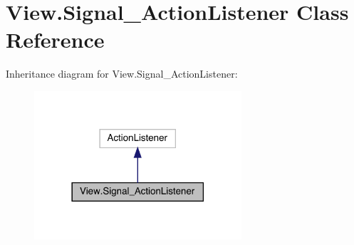 \hypertarget{class_view_1_1_signal___action_listener}{}\section{View.\+Signal\+\_\+\+Action\+Listener Class Reference}
\label{class_view_1_1_signal___action_listener}


Inheritance diagram for View.\+Signal\+\_\+\+Action\+Listener\+:
\nopagebreak
\begin{figure}[H]
\begin{center}
\leavevmode
\includegraphics[width=218pt]{class_view_1_1_signal___action_listener__inherit__graph}
\end{center}
\end{figure}


